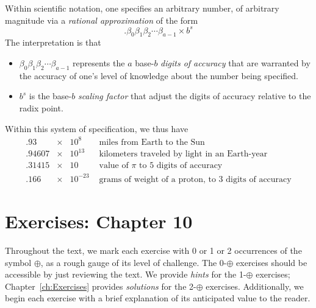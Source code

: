 \medskip

Within scientific notation, one specifies an arbitrary number, of arbitrary magnitude via a {\em rational approximation} of the form
\[ . \beta_0 \beta_1 \beta_2 \cdots \beta_{a-1} \times b^s \]
The interpretation is that
\begin{itemize}
\item
$\beta_0 \beta_1 \beta_2 \cdots \beta_{a-1}$ represents the $a$ base-$b$ {\em digits of accuracy} that are warranted by the accuracy of one's level of knowledge about the number being specified.

\medskip\item
$b^s$ is the base-$b$ {\em scaling factor} that adjust the digits of accuracy relative to the radix point.
\end{itemize}
Within this system of specification, we thus have
\[ \begin{array}{lcll}
.93       & \times & 10^8      & \mbox{ miles from Earth to the Sun} \\
.94607 & \times & 10^{13}  & \mbox{ kilometers traveled by light in an Earth-year} \\
.31415 & \times & 10          & \mbox{ value of $\pi$ to $5$ digits of accuracy} \\
.166     & \times & 10^{-23} & \mbox{ grams of weight of a proton, to $3$ digits of accuracy}
\end{array}
\]



\section{Exercises: Chapter 10}

Throughout the text, we mark each exercise with 0 or 1 or 2 occurrences of the symbol $\oplus$, as a rough gauge of its level of challenge.  The 0-$\oplus$ exercises should be accessible by just reviewing the text.  We provide {\em hints} for the 1-$\oplus$ exercises; Chapter~\ref{ch:Exercises} provides {\em solutions} for the 2-$\oplus$ exercises.  Additionally, we begin each exercise with a brief explanation of its anticipated value to the reader. 

